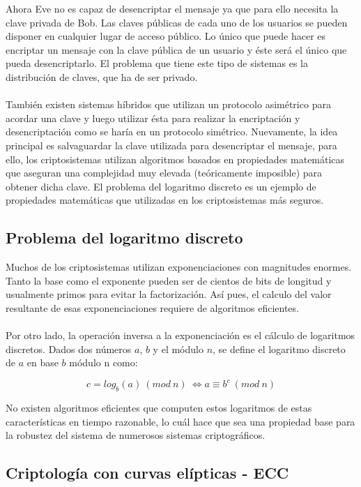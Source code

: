 \documentclass[../PFC.tex]{subfiles}
\begin{document}
Ahora Eve no es capaz de desencriptar el mensaje ya que para ello necesita la clave privada de Bob. Las claves públicas de cada uno de los usuarios se pueden disponer en cualquier lugar de acceso público. Lo único que puede hacer es encriptar un mensaje con la clave pública de un usuario y éste será el único que pueda desencriptarlo. El problema que tiene este tipo de sistemas es la distribución de claves, que ha de ser privado.
\\\\
También existen sistemas híbridos que utilizan un protocolo asimétrico para acordar una clave y luego utilizar ésta para realizar la encriptación y desencriptación como se haría en un protocolo simétrico. Nuevamente, la idea principal es salvaguardar la clave utilizada para desencriptar el mensaje, para ello, los criptosistemas utilizan algoritmos basados en propiedades matemáticas que aseguran una complejidad muy elevada (teóricamente imposible) para obtener dicha clave. El problema del logaritmo discreto es un ejemplo de propiedades matemáticas que utilizadas en los criptosistemas más seguros.

\subsection{Problema del logaritmo discreto}
\label{Problema del logaritmo discreto}

Muchos de los criptosistemas utilizan exponenciaciones con magnitudes enormes. Tanto la base como el exponente pueden ser de cientos de bits de longitud y usualmente primos para evitar la factorización. Así pues, el calculo del valor resultante de esas exponenciaciones requiere de algoritmos eficientes. 
\\\\
Por otro lado, la operación inversa a la exponenciación es el cálculo de logaritmos discretos. Dados dos números $a$, $b$ y el módulo $n$, se define el logaritmo discreto de $a$ en base $b$ módulo n como\cite{lucena}:

\begin{equation}
c = log_{b}(a)\ (mod\ n)\ \Leftrightarrow a \equiv b^c\ (mod\ n)
\end{equation}

No existen algoritmos eficientes que computen estos logaritmos de estas características en tiempo razonable, lo cuál hace que sea una propiedad base para la robustez del sistema de numerosos sistemas criptográficos.


\subsection{Criptología con curvas elípticas - ECC}
\label{Criptología con curvas elípticas - ECC}
\end{document}
